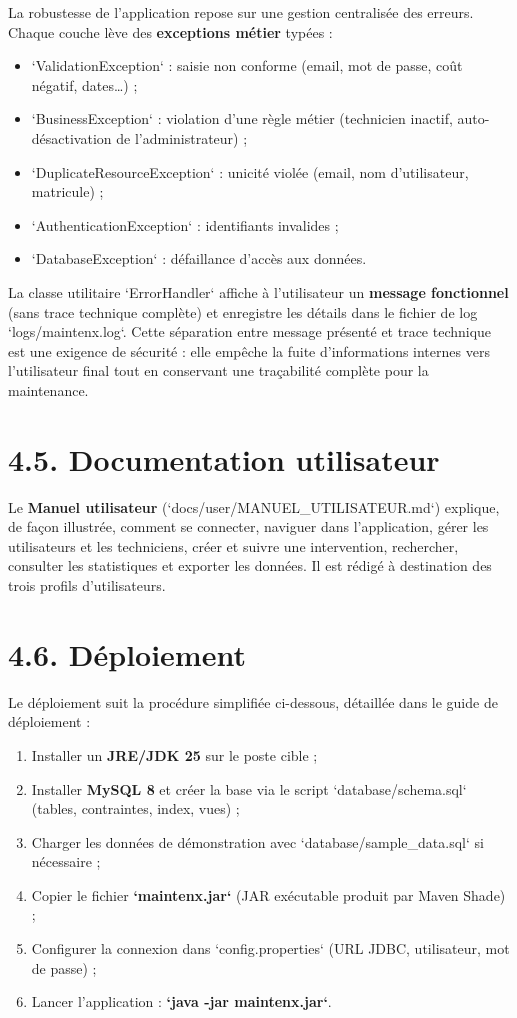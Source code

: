 \documentclass[11pt,a4paper]{report}
\begin{document}
La robustesse de l'application repose sur une gestion centralisée des erreurs. Chaque couche lève des \textbf{exceptions métier} typées :
\begin{itemize}
  \item `ValidationException` : saisie non conforme (email, mot de passe, coût négatif, dates…) ;
  \item `BusinessException` : violation d'une règle métier (technicien inactif, auto-désactivation de l'administrateur) ;
  \item `DuplicateResourceException` : unicité violée (email, nom d'utilisateur, matricule) ;
  \item `AuthenticationException` : identifiants invalides ;
  \item `DatabaseException` : défaillance d'accès aux données.
\end{itemize}

La classe utilitaire `ErrorHandler` affiche à l'utilisateur un \textbf{message fonctionnel} (sans trace technique complète) et enregistre les détails dans le fichier de log `logs/maintenx.log`. Cette séparation entre message présenté et trace technique est une exigence de sécurité : elle empêche la fuite d'informations internes vers l'utilisateur final tout en conservant une traçabilité complète pour la maintenance.
\section*{4.5. Documentation utilisateur}

Le \textbf{Manuel utilisateur} (`docs/user/MANUEL\_UTILISATEUR.md`) explique, de façon illustrée, comment se connecter, naviguer dans l'application, gérer les utilisateurs et les techniciens, créer et suivre une intervention, rechercher, consulter les statistiques et exporter les données. Il est rédigé à destination des trois profils d'utilisateurs.
\section*{4.6. Déploiement}

Le déploiement suit la procédure simplifiée ci-dessous, détaillée dans le guide de déploiement :
\begin{enumerate}
  \item Installer un \textbf{JRE/JDK 25} sur le poste cible ;
  \item Installer \textbf{MySQL 8} et créer la base via le script `database/schema.sql` (tables, contraintes, index, vues) ;
  \item Charger les données de démonstration avec `database/sample\_data.sql` si nécessaire ;
  \item Copier le fichier \textbf{`maintenx.jar`} (JAR exécutable produit par Maven Shade) ;
  \item Configurer la connexion dans `config.properties` (URL JDBC, utilisateur, mot de passe) ;
  \item Lancer l'application : \textbf{`java -jar maintenx.jar`}.
\end{enumerate}
\end{document}
